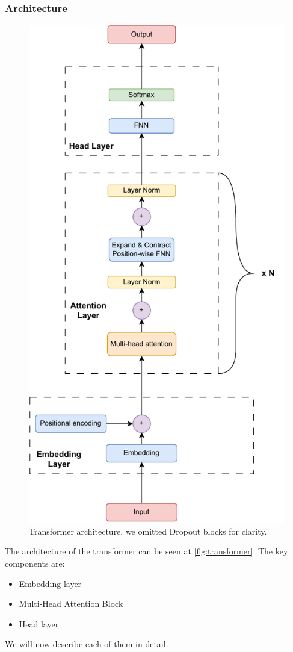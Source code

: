 \subsubsection{Architecture}
\begin{figure}[h]
    \centering
    \includegraphics[width=0.7\linewidth]{img/transformer/trans_architecture.pdf}
    \caption{Transformer architecture, we omitted Dropout blocks for clarity.}
    \label{fig:transformer}
\end{figure}
    
The architecture of the transformer can be seen at \autoref{fig:transformer}.
The key components are:
\begin{itemize}
    \item Embedding layer
    \item Multi-Head Attention Block
    \item Head layer
\end{itemize}
We will now describe each of them in detail.
